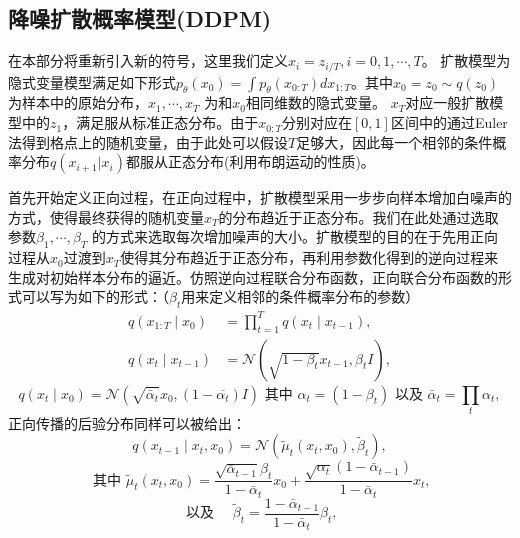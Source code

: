 \subsection{降噪扩散概率模型(DDPM)}
在本部分将重新引入新的符号，这里我们定义$x_i= z_{i/T},i=0,1,\cdots,T$。
扩散模型为隐式变量模型满足如下形式$p_{\theta}(x_0) = \int p_{\theta}(x_{0:T}) dx_{1:T}$。其中$x_0=z_0\sim q(z_0)$为样本中的原始分布，$x_1,\cdots, x_{T}$ 为和$x_0$相同维数的隐式变量。 $x_T$对应一般扩散模型中的$z_1$，满足服从标准正态分布。由于$x_{0:T}$分别对应在$[0,1]$区间中的通过Euler法得到格点上的随机变量，由于此处可以假设$T$足够大，因此每一个相邻的条件概率分布$q(x_{i+1}|x_i)$都服从正态分布(利用布朗运动的性质)。\par 
首先开始定义正向过程，在正向过程中，扩散模型采用一步步向样本增加白噪声的方式，使得最终获得的随机变量$x_T$的分布趋近于正态分布。我们在此处通过选取参数$\beta_1, \cdots, \beta_{T}$ 的方式来选取每次增加噪声的大小。扩散模型的目的在于先用正向过程从$x_0$过渡到$x_T$使得其分布趋近于正态分布，再利用参数化得到的逆向过程来生成对初始样本分布的逼近。仿照逆向过程联合分布函数，正向联合分布函数的形式可以写为如下的形式：（$\beta_t$用来定义相邻的条件概率分布的参数）
\begin{align}
    q\left(x_{1: T} \mid x_0\right)&=\prod_{t=1}^T q\left(x_t \mid x_{t-1}\right),\\
        q\left(x_t \mid x_{t-1}\right)&=\mathcal{N}\left(\sqrt{1-\beta_t} x_{t-1}, \beta_t I\right),
        \end{align}
        \begin{equation}
            q\left(x_t \mid x_0\right)=\mathcal{N}\left(\sqrt{\bar{\alpha}_t} x_0,\left(1-\overline{\alpha_t}\right) I\right) \text { 其中 } \alpha_t=\left(1-\beta_t\right) \text { 以及 } \bar{\alpha}_t=\prod_t \alpha_t,
            \label{posterior of xt}
            \end{equation}
    正向传播的后验分布同样可以被给出：
    \begin{equation}
        q\left(x_{t-1} \mid x_t, x_0\right)=\mathcal{N}\left(\tilde{\mu}_t\left(x_t, x_0\right), \tilde{\beta}_t\right),
        \label{posterior xt 2}
        \end{equation}
        \begin{equation}
            \text {     其中 } \tilde{\mu}_t\left(x_t, x_0\right)=\frac{\sqrt{\bar{\alpha}_{t-1}} \beta_t}{1-\bar{\alpha}_t} x_0+\frac{\sqrt{\alpha_t}\left(1-\bar{\alpha}_{t-1}\right)}{1-\bar{\alpha}_t} x_t,
            \end{equation}
            \begin{equation}
                \text { 以及 } \quad \tilde{\beta}_t=\frac{1-\bar{\alpha}_{t-1}}{1-\bar{\alpha}_t} \beta_t,
                \end{equation}
